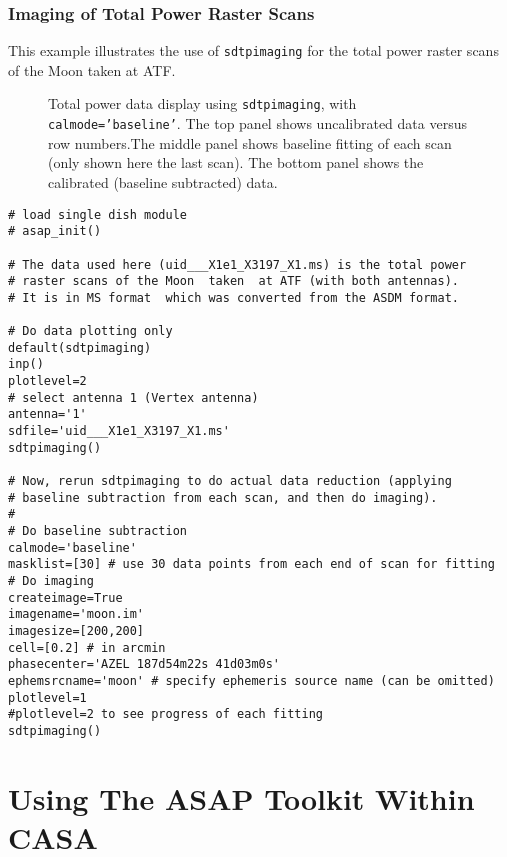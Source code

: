\subsubsection{Imaging of Total Power Raster Scans}
This example illustrates the use of {\tt sdtpimaging} for the total
power raster scans of the Moon taken at ATF.
\begin{figure}[h!]
\begin{center}
\caption{\label{fig:sdtpimaging} Total power data display using {\tt sdtpimaging}, 
with {\tt calmode='baseline'}. The top  panel shows uncalibrated data versus row numbers.The middle panel shows baseline fitting of each scan (only shown here the last
scan). The bottom panel shows the calibrated (baseline subtracted) data. }
\hrulefill
\end{center}
\end{figure}

\begin{verbatim}
# load single dish module
# asap_init()

# The data used here (uid___X1e1_X3197_X1.ms) is the total power 
# raster scans of the Moon  taken  at ATF (with both antennas). 
# It is in MS format  which was converted from the ASDM format.

# Do data plotting only
default(sdtpimaging)
inp()
plotlevel=2
# select antenna 1 (Vertex antenna) 
antenna='1'
sdfile='uid___X1e1_X3197_X1.ms'
sdtpimaging()

# Now, rerun sdtpimaging to do actual data reduction (applying
# baseline subtraction from each scan, and then do imaging).
#
# Do baseline subtraction 
calmode='baseline'
masklist=[30] # use 30 data points from each end of scan for fitting
# Do imaging 
createimage=True
imagename='moon.im'
imagesize=[200,200]
cell=[0.2] # in arcmin
phasecenter='AZEL 187d54m22s 41d03m0s'  
ephemsrcname='moon' # specify ephemeris source name (can be omitted)
plotlevel=1
#plotlevel=2 to see progress of each fitting
sdtpimaging()
\end{verbatim}



\section{Using The ASAP Toolkit Within CASA}
\label{section:sd.asap}

